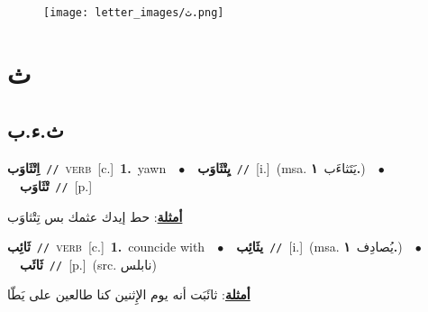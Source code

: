 \documentclass[10pt,a4paper,twoside]{article} %
\begin{document}
\begin{figure*}[t!]\centering\texttt{[image: letter\_images/ث.png]}\end{figure*}
\color{white}

 \section*{\foreignlanguage{arabic}{ث}} 
 \begin{multicols}{2} 

%
\color{black}
\vspace{-3mm}
\subsection*{\color{blue}\foreignlanguage{arabic}{ث.ء.ب}\color{blue}{}} 

{\setlength\topsep{0pt}\textbf{\foreignlanguage{arabic}{اِتْثَاوَب}}\ {\color{gray}\texttt{//}\color{black}}\ \textsc{verb}\ [c.]\ \textbf{1.}~yawn\ \ $\bullet$\ \ \setlength\topsep{0pt}\textbf{\foreignlanguage{arabic}{يِتْثَاوَب}}\ {\color{gray}\texttt{//}\color{black}}\ [i.]\ \color{gray}(msa. \foreignlanguage{arabic}{يَتَثاءَب}~\foreignlanguage{arabic}{\textbf{١.}})\color{black}\ \ $\bullet$\ \ \setlength\topsep{0pt}\textbf{\foreignlanguage{arabic}{تْثَاوَب}}\ {\color{gray}\texttt{//}\color{black}}\ [p.]\  \begin{flushright}\color{gray}\foreignlanguage{arabic}{\textbf{\underline{\foreignlanguage{arabic}{أمثلة}}}: حط إيدك عثمك بس تِتْثاوَب}\end{flushright}\color{black}} \vspace{2mm}

{\setlength\topsep{0pt}\textbf{\foreignlanguage{arabic}{ثَائِب}}\ {\color{gray}\texttt{//}\color{black}}\ \textsc{verb}\ [c.]\ \textbf{1.}~councide with\ \ $\bullet$\ \ \setlength\topsep{0pt}\textbf{\foreignlanguage{arabic}{يثَائِب}}\ {\color{gray}\texttt{//}\color{black}}\ [i.]\ \color{gray}(msa. \foreignlanguage{arabic}{يُصادِف}~\foreignlanguage{arabic}{\textbf{١.}})\color{black}\ \ $\bullet$\ \ \setlength\topsep{0pt}\textbf{\foreignlanguage{arabic}{ثَائَب}}\ {\color{gray}\texttt{//}\color{black}}\ [p.]\ (src. \color{gray}\foreignlanguage{arabic}{نابلس}\color{black})\  \begin{flushright}\color{gray}\foreignlanguage{arabic}{\textbf{\underline{\foreignlanguage{arabic}{أمثلة}}}: ثائَبَت أنه يوم الإِثنين كنا طالعين على يَطّا}\end{flushright}\color{black}} \vspace{2mm}


\end{multicols}
\end{document}
